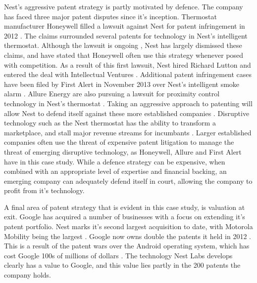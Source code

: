 Nest's aggressive patent strategy is partly motivated by defence. 
The company has faced three major patent disputes since it's inception.
Thermostat manufacturer Honeywell filled a lawsuit against Nest for patent infringement in 2012 \cite{NestHoneywellGig, NestHoneywellVerge, NestHoneywell}.
The claims surrounded several patents for technology in Nest's intelligent thermostat.
Although the lawsuit is ongoing \cite{NestFirstVerge}, Nest has largely dismissed these claims, and have stated that Honeywell often use this strategy whenever posed with competition.
As a result of this first lawsuit, Nest hired Richard Lutton and entered the deal with Intellectual Ventures \cite{NestFirstGig}.
Additional patent infringement cases have been filed by First Alert in November 2013 over Nest's intelligent smoke alarm \cite{NestFirstVerge, NestFirstGig}.
Allure Energy are also pursuing a lawsuit for proximity control technology in Nest's thermostat \cite{NestAllureCnet}.
Taking an aggressive approach to patenting will allow Nest to defend itself against these more established companies \cite{NestAllureCnet}.
Disruptive technology such as the Nest thermostat has the ability to transform a marketplace, and stall major revenue streams for incumbants \cite{NestCoLabs}. 
Larger established companies often use the threat of expensive patent litigation to manage the threat of emerging disruptive technology, as Honeywell, Allure and First Alert have in this case study.
While a defence strategy can be expensive, when combined with an appropriate level of expertise and financial backing, an emerging company can adequately defend itself in court, allowing the company to profit from it's technology.

A final area of patent strategy that is evident in this case study, is valuation at exit.
Google has acquired a number of businesses with a focus on extending it's patent portfolio.
Nest marks it's second largest acquisition to date, with Motorola Mobility being the largest \cite{NestReuters}.
Google now owns double the patents it held in 2012 \cite{NestCoLabs}.
This is a result of the patent wars over the Android operating system, which has cost Google 100s of millions of dollars \cite{NestCoLabs}.
The technology Nest Labs develops clearly has a value to Google, and this value lies partly in the 200 patents the company holds.




